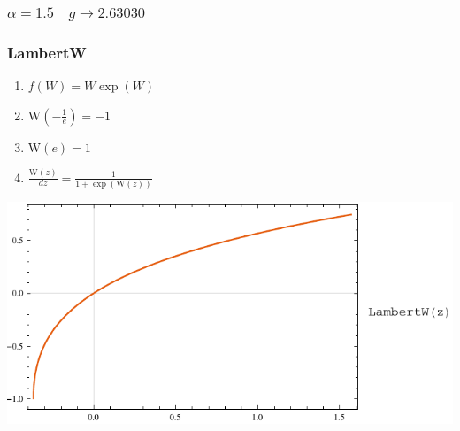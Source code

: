 \documentclass[fullscreen=true, unicode, bookmarks=false]{beamer}
\begin{document}
\begin{frame}
\frametitle{ $\alpha = 1.5 \quad g \rightarrow 2.63030$ }
\end{frame}

\begin{frame}
\frametitle{ LambertW }
\begin{flushleft}
    \begin{enumerate}
        \item $f(W)=W\exp{(W)}$
        \item $\text{W}(-\frac{1}{e})=-1$
        \item $\text{W}(e)=1$
        \item $\frac{\text{W}(z)}{d z}=\frac{1}{1+\exp{(\text{W}(z))}}$
    \end{enumerate}
\end{flushleft}
\begin{flushright}
\includegraphics[scale=0.7]{W_z.pdf}
\end{flushright}
\end{frame}
\end{document}

